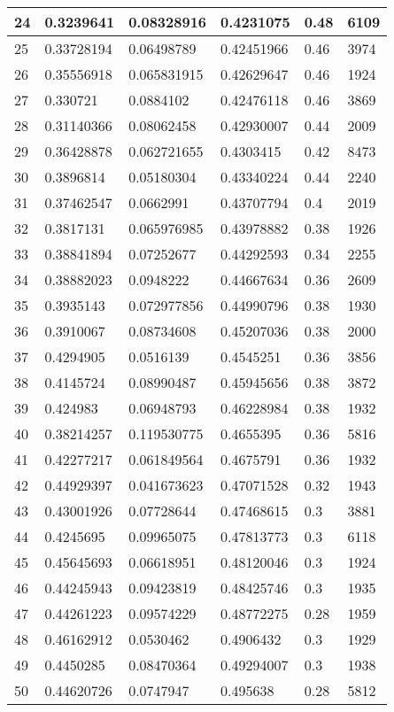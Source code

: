 \begin{longtable}{|l|l|l|l|l|l|}
24 & 0.3239641 & 0.08328916 & 0.4231075 & 0.48 & 6109 \\ \hline 
25 & 0.33728194 & 0.06498789 & 0.42451966 & 0.46 & 3974 \\ \hline 
26 & 0.35556918 & 0.065831915 & 0.42629647 & 0.46 & 1924 \\ \hline 
27 & 0.330721 & 0.0884102 & 0.42476118 & 0.46 & 3869 \\ \hline 
28 & 0.31140366 & 0.08062458 & 0.42930007 & 0.44 & 2009 \\ \hline 
29 & 0.36428878 & 0.062721655 & 0.4303415 & 0.42 & 8473 \\ \hline 
30 & 0.3896814 & 0.05180304 & 0.43340224 & 0.44 & 2240 \\ \hline 
31 & 0.37462547 & 0.0662991 & 0.43707794 & 0.4 & 2019 \\ \hline 
32 & 0.3817131 & 0.065976985 & 0.43978882 & 0.38 & 1926 \\ \hline 
33 & 0.38841894 & 0.07252677 & 0.44292593 & 0.34 & 2255 \\ \hline 
34 & 0.38882023 & 0.0948222 & 0.44667634 & 0.36 & 2609 \\ \hline 
35 & 0.3935143 & 0.072977856 & 0.44990796 & 0.38 & 1930 \\ \hline 
36 & 0.3910067 & 0.08734608 & 0.45207036 & 0.38 & 2000 \\ \hline 
37 & 0.4294905 & 0.0516139 & 0.4545251 & 0.36 & 3856 \\ \hline 
38 & 0.4145724 & 0.08990487 & 0.45945656 & 0.38 & 3872 \\ \hline 
39 & 0.424983 & 0.06948793 & 0.46228984 & 0.38 & 1932 \\ \hline 
40 & 0.38214257 & 0.119530775 & 0.4655395 & 0.36 & 5816 \\ \hline 
41 & 0.42277217 & 0.061849564 & 0.4675791 & 0.36 & 1932 \\ \hline 
42 & 0.44929397 & 0.041673623 & 0.47071528 & 0.32 & 1943 \\ \hline 
43 & 0.43001926 & 0.07728644 & 0.47468615 & 0.3 & 3881 \\ \hline 
44 & 0.4245695 & 0.09965075 & 0.47813773 & 0.3 & 6118 \\ \hline 
45 & 0.45645693 & 0.06618951 & 0.48120046 & 0.3 & 1924 \\ \hline 
46 & 0.44245943 & 0.09423819 & 0.48425746 & 0.3 & 1935 \\ \hline 
47 & 0.44261223 & 0.09574229 & 0.48772275 & 0.28 & 1959 \\ \hline 
48 & 0.46162912 & 0.0530462 & 0.4906432 & 0.3 & 1929 \\ \hline 
49 & 0.4450285 & 0.08470364 & 0.49294007 & 0.3 & 1938 \\ \hline 
50 & 0.44620726 & 0.0747947 & 0.495638 & 0.28 & 5812 \\ \hline 
\end{longtable}